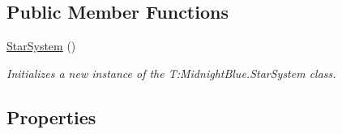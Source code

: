 \subsection*{Public Member Functions}
\begin{DoxyCompactItemize}
\item 
\hyperlink{class_midnight_blue_1_1_star_system_a781acf7d61cc1609bc0f5db94593a963}{Star\+System} ()
\begin{DoxyCompactList}\small\item\em Initializes a new instance of the T\+:\+Midnight\+Blue.\+Star\+System class. \end{DoxyCompactList}\end{DoxyCompactItemize}
\subsection*{Properties}
